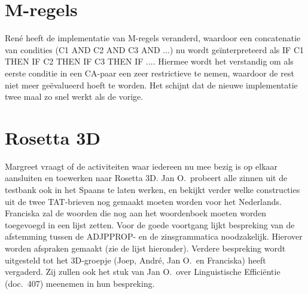 \section{M-regels}
Ren\'{e} heeft de implementatie van M-regels veranderd, waardoor een 
concatenatie van condities (C1 AND C2 AND C3 AND ...) nu wordt 
ge\"{i}nterpreteerd als IF C1 THEN IF C2 THEN IF C3 THEN IF .... Hiermee wordt 
het verstandig om als eerste conditie in een CA-paar een zeer restrictieve te 
nemen, waardoor de rest niet meer ge\"{e}valueerd hoeft te worden. Het schijnt 
dat de nieuwe implementatie twee maal zo snel werkt als de vorige.

\section{Rosetta 3D}
Margreet vraagt of de activiteiten waar iedereen nu mee bezig is op elkaar 
aansluiten en toewerken naar Rosetta 3D. Jan O.\ probeert alle zinnen uit de 
testbank ook in het Spaans te laten werken, en bekijkt verder welke 
constructies uit de twee TAT-brieven nog gemaakt moeten worden voor het 
Nederlands. Franciska zal de woorden die nog aan het woordenboek moeten worden 
toegevoegd in een lijst zetten. Voor de goede voortgang lijkt bespreking van 
de afstemming tussen 
de ADJPPROP- en de zinsgrammatica noodzakelijk. Hier\-over worden afspraken 
gemaakt (zie de lijst hieronder). 
Verdere bespreking wordt uitgesteld tot het 3D-groepje (Joep, 
Andr\'{e}, Jan O.\ en Franciska) heeft vergaderd. Zij zullen ook het stuk van 
Jan O.\ over Linguistische Effici\"{e}ntie (doc.\ 407) meenemen in hun 
bespreking.

\newpage
\appendix
\noindent
